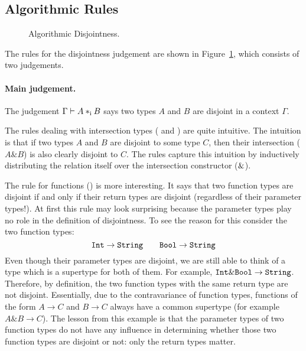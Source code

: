 \subsection{Algorithmic Rules}


\begin{figure}[h]


  \caption{Algorithmic Disjointness.}
  \label{fig:disjointness}
\end{figure}

The rules for the disjointness judgement are shown in
Figure~\ref{fig:disjointness}, which consists of two judgements.

\paragraph{Main judgement.} The judgement $\Gamma \vdash A *_\textnormal{i} B$ says
two types $A$ and $B$ are disjoint in a context
$\Gamma$.

The rules dealing with intersection types (
and ) are quite intuitive. The intuition is
that if two types $A$ and $B$ are disjoint to some type $C$, then
their intersection ($A\&B$) is also clearly disjoint to $C$.  The
rules capture this intuition by inductively distributing the relation
itself over the intersection constructor ($\&$).

The rule for functions () is more interesting. It says that two function
types are disjoint if and only if their return types are disjoint (regardless of
their parameter types!). At first this rule may look surprising
because the parameter types play no role in the definition of
disjointness. To see the reason for this consider the two function types:
\[ \texttt{Int} \to \texttt{String} \qquad \texttt{Bool} \to \texttt{String} \]
Even though their parameter types are disjoint, we are still able to think of a
type which is a supertype for both of them. For example, $ \texttt{Int} \& \texttt{Bool}
\to \texttt{String} $. Therefore, by definition, the two function types with
the same return type are not
disjoint. Essentially, due to the contravariance of function types,
functions of the form $A \to C$ and $B \to C$ always have a common
supertype (for example $A \& B \to C$).
The lesson from this example is that the parameter types of two
function types do not have any influence in determining whether those two function
types are disjoint or not: only the return types matter.

